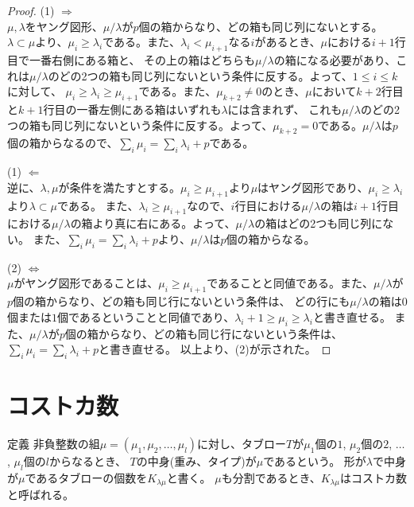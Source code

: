 \documentclass[a4paper,11pt]{jsarticle}
\theoremstyle{plain}
\theoremstyle{definition}
\renewcommand{\(}{\left(}
\renewcommand{\)}{\right)}
\renewcommand{\[}{\left[}
\renewcommand{\]}{\right]}
\renewcommand{\{}{\left\lbrace}
\renewcommand{\}}{\right\rbrace}
\newcommand{\Iff}{\Longleftrightarrow}
\newcommand{\To}{\Longrightarrow}
\begin{document}
\begin{proof}
    \subitem (1) $\To$ \\
    $\mu, \lambda$をヤング図形、$\mu/\lambda$が$p$個の箱からなり、どの箱も同じ列にないとする。
    $\lambda \subset \mu$より、$\mu_i \geq \lambda_i$である。また、$\lambda_i < \mu_{i+1}$なる$i$があるとき、$\mu$における$i+1$行目で一番右側にある箱と、
    その上の箱はどちらも$\mu / \lambda$の箱になる必要があり、これは$\mu / \lambda$のどの2つの箱も同じ列にないという条件に反する。よって、$1 \leq i \leq k$に対して、
    $\mu_i \geq \lambda_i \geq \mu_{i+1}$である。また、$\mu_{k+2} \neq 0$のとき、$\mu$において$k+2$行目と$k+1$行目の一番左側にある箱はいずれも$\lambda$には含まれず、
    これも$\mu / \lambda$のどの2つの箱も同じ列にないという条件に反する。よって、$\mu_{k+2} = 0$である。$\mu / \lambda$は$p$個の箱からなるので、$\sum_{i} \mu_i = \sum_{i} \lambda_i + p$である。

    \subitem (1) $\Longleftarrow$ \\
    逆に、$\lambda, \mu$が条件を満たすとする。$\mu_i \geq \mu_{i+1}$より$\mu$はヤング図形であり、$\mu_i \geq \lambda_i$より$\lambda \subset \mu$である。
    また、$\lambda_i \geq \mu_{i+1}$なので、$i$行目における$\mu / \lambda$の箱は$i+1$行目における$\mu / \lambda$の箱より真に右にある。よって、$\mu / \lambda$の箱はどの2つも同じ列にない。
    また、$\sum_{i} \mu_i = \sum_{i} \lambda_i + p$より、$\mu / \lambda$は$p$個の箱からなる。

    \subitem (2) $\Iff$ \\
    $\mu$がヤング図形であることは、$\mu_i \geq \mu_{i+1}$であることと同値である。また、$\mu / \lambda$が$p$個の箱からなり、どの箱も同じ行にないという条件は、
    どの行にも$\mu / \lambda$の箱は$0$個または$1$個であるということと同値であり、$\lambda_i+1 \geq \mu_i \geq \lambda_{i}$と書き直せる。
    また、$\mu / \lambda$が$p$個の箱からなり、どの箱も同じ行にないという条件は、$\sum_{i} \mu_i = \sum_{i} \lambda_i + p$と書き直せる。
    以上より、(2)が示された。
\end{proof}

\newpage
\section{コストカ数}

\begin{itembox}[l]{定義}
    非負整数の組$\mu = (\mu_1, \mu_2, \ldots, \mu_l)$に対し、タブロー$T$が$\mu_1$個の$1$, $\mu_2$個の$2$, $\ldots$, $\mu_l$個の$l$からなるとき、
    $T$の中身(重み、タイプ)が$\mu$であるという。
    形が$\lambda$で中身が$\mu$であるタブローの個数を$K_{\lambda \mu}$と書く。
    $\mu$も分割であるとき、$K_{\lambda \mu}$はコストカ数と呼ばれる。
\end{itembox}
\end{document}
